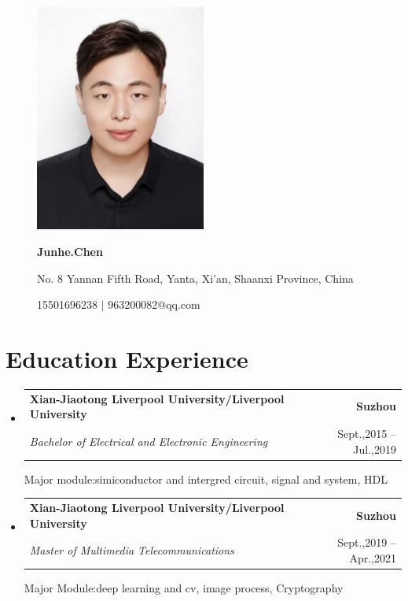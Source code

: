 \documentclass[A4,11pt]{article}
\makeatletter
\newcommand{\CVSubheading}[4]{
  \vspace{-2pt}\item
    \begin{tabular*}{0.97\textwidth}[t]{l@{\extracolsep{\fill}}r}
      \textbf{#1} & #2 \\
      \small#3 & \small #4 \\
    \end{tabular*}\vspace{-7pt}
}
\newcommand{\CVSubHeadingListStart}{\begin{itemize}[leftmargin=0.5cm, label={}]}
\newcommand{\CVSubHeadingListEnd}{\end{itemize}}
\makeatother
\begin{document}
\begin{figure}[h]
\begin{minipage}[c]{0.2\textwidth}
\includegraphics[width = 0.5\textwidth]{portrait}
\end{minipage}
\begin{minipage}[c]{0.7\textwidth}
    \centerline{\textbf{\Huge Junhe.Chen}} 
    \vspace{20pt} 
    
    \centerline{No. 8 Yannan Fifth Road, Yanta, Xi'an, Shaanxi Province, China}
    
    \centerline{15501696238 $\mid$ 963200082@qq.com}
\end{minipage}
\end{figure}

\section{Education Experience}
  \CVSubHeadingListStart
    \CVSubheading
      {Xian-Jiaotong Liverpool University/Liverpool University}{\textbf{Suzhou}}
      {\textit{Bachelor of Electrical and Electronic Engineering}}{Sept.,2015 -- Jul.,2019}
      \quad 
      
      {Major module:simiconductor and intergred circuit, signal and system, HDL}{\quad }
    \CVSubheading
      {Xian-Jiaotong Liverpool University/Liverpool University}{\textbf{Suzhou}}
      {\textit{Master of Multimedia Telecommunications}}{Sept.,2019 -- Apr.,2021}
      
      {Major Module:deep learning and cv, image process, Cryptography}{\quad }
  \CVSubHeadingListEnd
\end{document}
